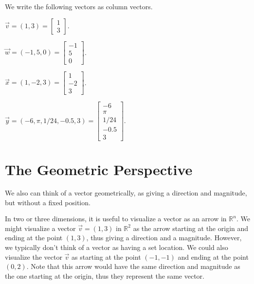 \documentclass{ximera}
\begin{document}
\begin{example}
We write the following vectors as column vectors.

$\vec{v} = (1,3)=\left[\begin{array}{c}1\\3\end{array}\right]$.

$\vec{w} = (-1,5,0)=\left[\begin{array}{c}-1\\5\\0\end{array}\right]$.

$\vec{x} = (1,-2,3)=\left[\begin{array}{c}1\\-2\\3\end{array}\right]$.

$\vec{y} = (-6,\pi, 1/24, -0.5, 3)=\left[\begin{array}{c}-6\\\pi\\1/24\\-0.5\\3\end{array}\right]$.
\end{example}

\section*{The Geometric Perspective}

We also can think of a vector geometrically, as giving a direction and magnitude, but without a fixed position.

In two or three dimensions, it is useful to visualize a vector as an arrow in $\mathbb{R}^n$. We might visualize a vector $\vec{v}=(1,3)$ in $\mathbb{R}^2$ as the arrow starting at the origin and ending at the point $(1,3)$, thus giving a direction and a magnitude. However, we typically don't think of a vector as having a set location. We could also visualize the vector $\vec{v}$ as starting at the point $(-1,-1)$ and ending at the point $(0,2)$. Note that this arrow would have the same direction and magnitude as the one starting at the origin, thus they represent the same vector.
\end{document}
